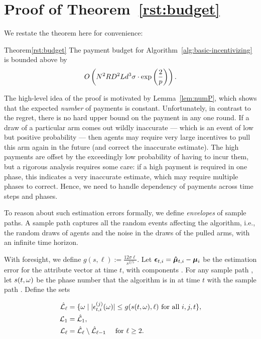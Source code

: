 \section{Proof of Theorem~\ref{rst:budget}}
\label{sec:payment-proof}

We restate the theorem here for convenience:

\begin{rtheorem}{Theorem}{\ref{rst:budget}}
The payment budget for Algorithm~\ref{alg:basic-incentivizing} is bounded above by 
\begin{align}
O \left(N^2 R D^2 L d^3 \sigma\cdot \exp\left(\frac{2}{p}\right) \right).  \nonumber 
\end{align}
\end{rtheorem}

The high-level idea of the proof is motivated by Lemma~\ref{lem:numP},
which shows that the expected \emph{number} of payments is constant.
Unfortunately, in contrast to the regret, there is no hard upper bound
on the payment in any one round.
If a draw of a particular arm comes out wildly inaccurate --- which is
an event of low but positive probability ---
then agents may require very large incentives to pull this arm again
in the future (and correct the inaccurate estimate).
The high payments are offset by the exceedingly low probability of
having to incur them, but a rigorous analysis requires some care:
if a high payment is required in one phase, this indicates a very
inaccurate estimate, which may require multiple phases to correct.
Hence, we need to handle dependency of payments across time steps and
phases.

To reason about such estimation errors formally, we define
\emph{envelopes} of sample paths.
A sample path \SP captures all the random events affecting the
algorithm, i.e., the random draws  of agents and the
noise \NoiseV[t] in the draws of the pulled arms,
with an infinite time horizon.

With foresight, we define $g(s, \ell) := \frac{12 \sigma \ell}{s^{2/5}}$.
Let $\bm{\epsilon}_{t,i} = \bm{\hat{\mu}}_{t,i} - \bm{\mu}_{i}$ be the estimation
error for the attribute vector  at time $t$,
with components .
For any sample path \SP, let $s (t,\omega)$ be the phase number that the
algorithm is in at time $t$ with the sample path \SP.
Define the sets

\begin{align*}
\hat{\mathcal{L}}_\ell
  & = \{ \omega \mid |\epsilon_{t,i}^{(j)}(\omega)| \leq g(s(t,\omega),\ell)
    \mbox{ for all } i,j,t \},\\
{\mathcal L}_{1} & = \hat{\mathcal{L}}_1,\\ 
{\mathcal L}_{\ell} & = \hat{\mathcal{L}}_{\ell} \setminus \hat{\mathcal{L}}_{\ell-1}
  \quad \mbox{ for } \ell \geq 2.
\end{align*}

